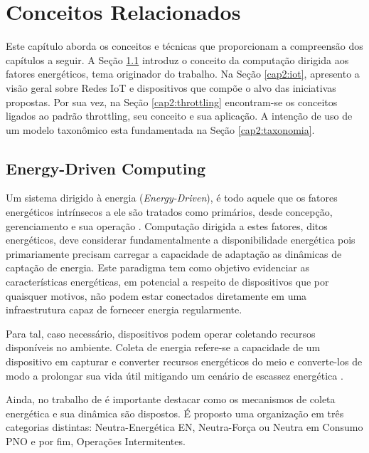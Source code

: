 \chapter{Conceitos Relacionados}
\label{cap:cap2}

Este capítulo aborda os conceitos e técnicas que proporcionam a compreensão dos capítulos a seguir. A Seção \ref{cap2:energyDriven} introduz o conceito da computação dirigida aos fatores energéticos, tema originador do trabalho. Na Seção \ref{cap2:iot}, apresento a visão geral sobre Redes IoT e dispositivos que compõe o alvo das iniciativas propostas. Por sua vez, na Seção \ref{cap2:throttling} encontram-se os conceitos ligados ao padrão throttling, seu conceito e sua aplicação. A intenção de uso de um modelo taxonômico esta fundamentada na Seção \ref{cap2:taxonomia}.

\section{Energy-Driven Computing}
\label{cap2:energyDriven}

Um sistema dirigido à energia (\textit{Energy-Driven}), é todo aquele que os fatores energéticos intrínsecos a ele são tratados como primários, desde concepção, gerenciamento e sua operação \cite{merrett_energy-driven_2017}. Computação dirigida a estes fatores, ditos energéticos, deve considerar fundamentalmente a disponibilidade energética pois primariamente precisam carregar a capacidade de adaptação as dinâmicas de captação de energia. Este paradigma tem como objetivo evidenciar as características energéticas, em potencial a respeito de dispositivos que por quaisquer motivos, não podem estar conectados diretamente em uma infraestrutura capaz de fornecer energia regularmente. 

Para tal, caso necessário, dispositivos podem operar coletando recursos disponíveis no ambiente. Coleta de energia refere-se a capacidade de um dispositivo em capturar e converter recursos energéticos do meio e converte-los de modo a prolongar sua vida útil mitigando um cenário de escassez energética \cite{sudevalayam_energy_2011}. 

Ainda, no trabalho de \cite{sliper_energy-driven_2020} é importante destacar como os mecanismos de coleta energética e sua dinâmica são dispostos. É proposto uma organização em três categorias distintas: Neutra-Energética \ac{EN}, Neutra-Força ou Neutra em Consumo \ac{PNO} e por fim, Operações Intermitentes.

